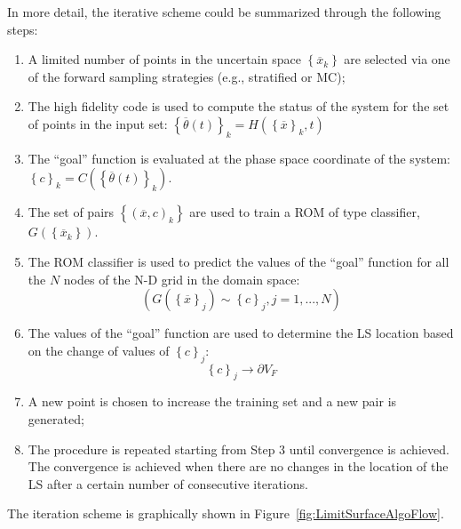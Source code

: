 In more detail, the iterative scheme could be summarized through the following steps:
\begin{enumerate}
  \item A limited number of points in the uncertain space $\left \{ 
  \overline{x}_{k} \right \}$ are selected via one of the forward 
  sampling strategies (e.g., stratified or MC);
  \item The high fidelity code is used to compute the status of the 
  system for the set of points in the input set: 
  $
  \left \{ \overline{\theta}(t)\right \}_{k} = H\left ( \left \{ \overline{x} \right 
  \}_{k},t \right )
  $
  \item The ``goal'' function is evaluated at the phase space coordinate 
  of the system:
  $\left \{ c \right \}_{k} = C\left ( \left \{ \overline{\theta}(t)\right \}_{k} 
  \right )$.
   \item The set of pairs $\left \{ \left ( \overline{x},c \right )_{k} \right \}$
   are used to train a ROM of type classifier, $G\left ( \left \{ 
   \overline{x}_{k} \right \} \right )$.
   \item The ROM classifier is used to predict the values of the ``goal''  
   function for all the $N$ nodes of the N-D grid in the domain space:
   \begin{equation}
   \left (G\left ( \left \{ \overline{x} \right \}_{j} \right ) \sim \left \{ c \right 
   \}_{j}, j=1,...,N  \right )
    \end{equation}
    \item The values of the ``goal''  function are used to determine the 
    LS location based on the change of values of  $\left \{ c \right 
    \}_{j}$:
    \begin{equation}
    \left \{ c \right \}_{j}\rightarrow \partial V_{F}
     \end{equation}
     \item A new point is chosen to increase the training set and a new 
     pair is generated;
     \item The procedure is repeated starting from Step 3 until 
     convergence is achieved. The convergence is achieved when 
     there are no changes in the location of the LS after a certain 
     number of consecutive iterations.
\end{enumerate}
The iteration scheme is graphically shown in 
Figure~\ref{fig:LimitSurfaceAlgoFlow}.
